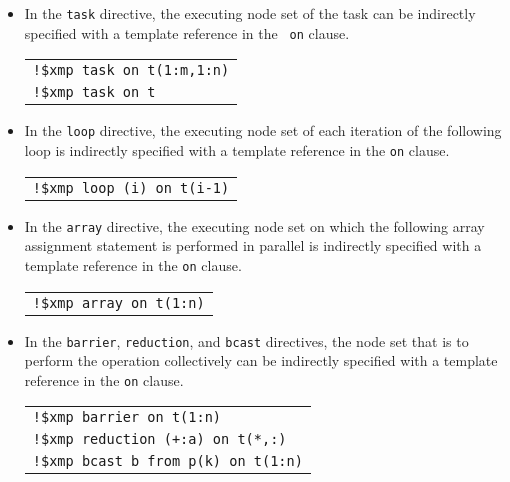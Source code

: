 \begin{itemize}
\item In the {\tt task} directive, the executing node set of the task
      can be indirectly specified with a template reference in the {\tt
      on} clause.

\begin{tabular}{l}
\verb|!$xmp task on t(1:m,1:n)| \\
\verb|!$xmp task on t| \\
\end{tabular}

\item In the {\tt loop} directive, the executing node set of each
      iteration of the following loop is indirectly specified with a
      template reference in the {\tt on} clause.

\begin{tabular}{l}
\verb|!$xmp loop (i) on t(i-1)| \\
\end{tabular}%

\item In the {\tt array} directive, the executing node set on which the
      following array assignment statement is performed in parallel is
      indirectly specified with a template reference in the {\tt on}
      clause.

\begin{tabular}{l}
\verb|!$xmp array on t(1:n)| \\
\end{tabular}%

\item In the {\tt barrier}, {\tt reduction}, and {\tt bcast} directives,
      the node set that is to perform the operation collectively can be
      indirectly specified with a template reference in the {\tt on}
      clause.

\begin{tabular}{l}
\verb|!$xmp barrier on t(1:n)| \\
\verb|!$xmp reduction (+:a) on t(*,:)| \\
\verb|!$xmp bcast b from p(k) on t(1:n)| \\
\end{tabular}

\end{itemize}


